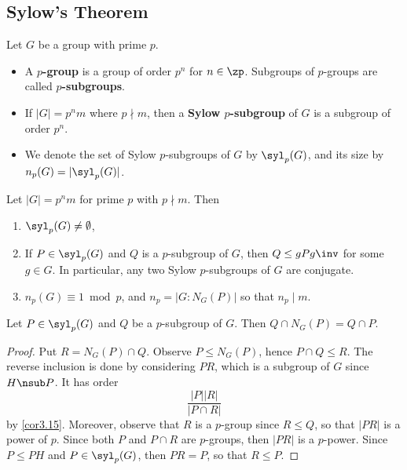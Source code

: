 \newpage

\subsection{Sylow's Theorem} \label{sec4.5}

 Let $G$ be a group with prime $p$.
\begin{itemize}
    \item A \textbf{$p$-group} is a group of order $p^n$ for $n \in \zp$. Subgroups of $p$-groups are called \textbf{$p$-subgroups}.
    \item If $|G| = p^nm$ where $p \nmid m$, then a \textbf{Sylow $p$-subgroup} of $G$ is a subgroup of order $p^n$.
    \item We denote the set of Sylow $p$-subgroups of $G$ by $\syl_p(G)$, and its size by $n_p(G) = |\syl_p(G)|$.
\end{itemize}

 \label{theo4.18}
Let $|G| = p^nm$ for prime $p$ with $p \nmid m$. Then
\begin{enumerate}
    \item $\syl_p(G) \neq \emptyset$,
    \item If $P \in \syl_p(G)$ and $Q$ is a $p$-subgroup of $G$, then $Q \leq gPg\inv$ for some $g \in G$. In particular, any two Sylow $p$-subgroups of $G$ are conjugate.
    \item $n_p(G) \equiv 1 \bmod p$, and $n_p = |G : N_G(P)|$ so that $n_p \mid m$.
\end{enumerate}
\dspace

 \label{lem4.19}
Let $P \in \syl_p(G)$ and $Q$ be a $p$-subgroup of $G$. Then $Q \cap N_G(P) = Q \cap P$.

\begin{proof}
    Put $R = N_G(P) \cap Q$. Observe $P \leq N_G(P)$, hence $P \cap Q \leq R$. The reverse inclusion is done by considering $PR$, which is a subgroup of $G$ since $H \nsub P$. It has order
    \[\frac{|P||R|}{|P \cap R|}\]
    by \autoref{cor3.15}. Moreover, observe that $R$ is a $p$-group since $R \leq Q$, so that $|PR|$ is a power of $p$. Since both $P$ and $P \cap R$ are $p$-groups, then $|PR|$ is a $p$-power. Since $P \leq PH$ and $P \in \syl_p(G)$, then $PR = P$, so that $R \leq P$.
\end{proof}

